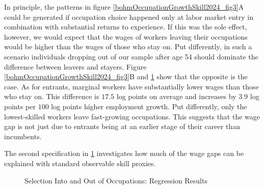 \documentclass[12pt]{article}
\newcommand{\highlightPP}[1]{{\emph{\color{MyPurple}{#1}}}}
\theoremstyle{definition}
\begin{document}
In principle, the patterns in figure \ref{bohmOccupationGrowthSkill2024_fig3}A could be generated if occupation choice happened only at labor market entry in combination with substantial returns to experience. If this was the sole effect, however, we would expect that the wages of workers leaving their occupations would be higher than the wages of those who stay on. Put differently, in such a scenario individuals dropping out of our sample after age 54 should dominate the difference between leavers and stayers. Figure \ref{bohmOccupationGrowthSkill2024_fig3}B and \ref{bohmOccupationGrowthSkill2024_tab1} show that the opposite is the case. As for entrants, marginal workers have substantially lower wages than those who stay on. This difference is $17.5$ log points on average and increases by $3.9$ log points per $100$ log points higher employment growth. Put differently, only the lowest-skilled workers leave fast-growing occupations. This suggests that the wage gap is not just due to entrants being at an earlier stage of their career than incumbents.

The second specification in \ref{bohmOccupationGrowthSkill2024_tab1} investigates how much of the wage gaps can be explained with standard observable skill proxies. \highlightPP{We first run Mincer regressions of individual workers' wages on full interactions of dummies for calendar year, education in three categories, and years of age. We use the residuals to compute the average wage gaps for entrants/leavers and their slopes with respect to occupation growth as before.}
\setcounter{figure}{0}
\renewcommand{\thefigure}{Table \arabic{figure}}
\begin{figure}[H]
    \noindent\caption{Selection Into and Out of Occupations: Regression Results}
    \begin{center}
        \label{bohmOccupationGrowthSkill2024_tab1}
    \end{center}
\end{figure}
\end{document}

